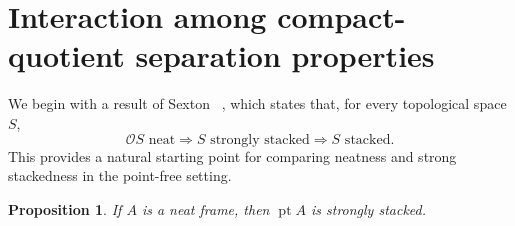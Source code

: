 \documentclass[11pt]{amsart}
\DeclareMathOperator{\pt}{pt}
\theoremstyle{plain}
\newtheorem{thm}{Theorem}[section]
\newtheorem{prop}[thm]{Proposition}
\theoremstyle{definition}
\begin{document}

\section{Interaction among compact-quotient separation properties}\label{Interaccion entre propiedades}

We begin with a result of Sexton
~\cite[Theorem 6.2(a)]{sexton2006ordinal}, which states that,
for every topological space $S$,
\[
\mathcal OS\text{ neat}
\Longrightarrow S\text{ strongly stacked}
\Longrightarrow S\text{ stacked}.
\]
This provides a natural starting point for
comparing neatness and strong stackedness in
the point-free setting.


\begin{prop}\label{NeatSS}
If $A$ is a neat frame, then $\pt A$
is strongly stacked.
\end{prop}
\end{document}
